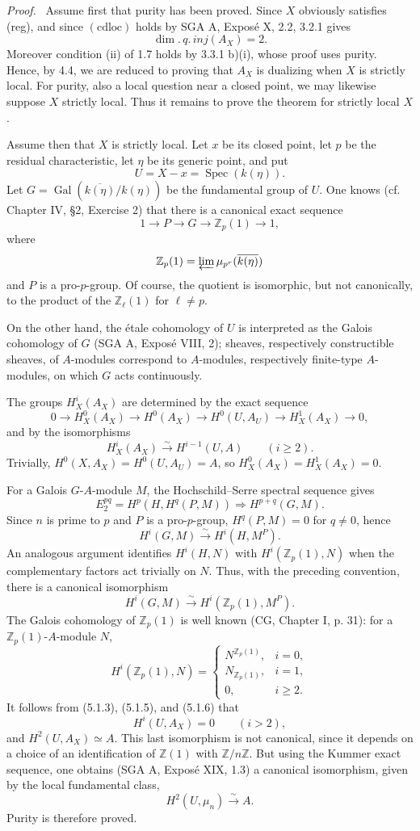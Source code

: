 \documentclass[11pt]{article}
\theoremstyle{plain}
\theoremstyle{definition}
\theoremstyle{remark}
\newenvironment{prooftext}{\par\noindent\textit{Proof.}\ }{\par\medskip}
\newcommand{\ZZ}{\mathbb Z}
\DeclareMathOperator{\Spec}{Spec}
\DeclareMathOperator{\Gal}{Gal}
\begin{document}
\begin{prooftext}
Assume first that purity has been proved. Since $X$ obviously satisfies (reg), and since $(\mathrm{cdloc})$ holds by SGA A, Exposé X, 2.2, 3.2.1 gives
\[
   \dim.\,q.\,inj(A_X)=2.
\]
Moreover condition (ii) of 1.7 holds by 3.3.1 b)(i), whose proof uses purity. Hence, by 4.4, we are reduced to proving that $A_X$ is dualizing when $X$ is strictly local. For purity, also a local question near a closed point, we may likewise suppose $X$ strictly local. Thus it remains to prove the theorem for strictly local $X$.

Assume then that $X$ is strictly local. Let $x$ be its closed point, let $p$ be the residual characteristic, let $\eta$ be its generic point, and put
\[
   U=X-x=\Spec(k(\eta)).
\]
Let $G=\Gal(\overline{k(\eta)}/k(\eta))$ be the fundamental group of $U$. One knows (cf. Chapter IV, §2, Exercise 2) that there is a canonical exact sequence
\[
   1\longrightarrow P\longrightarrow G\longrightarrow \ZZ_p(1)\longrightarrow1,\tag{5.1.1}
\]
where
\[
   \ZZ_p(1)=\varprojlim \mu_{p^r}(\overline{k(\eta)})
\]
and $P$ is a pro-$p$-group. Of course, the quotient is isomorphic, but not canonically, to the product of the $\ZZ_\ell(1)$ for $\ell\ne p$.

On the other hand, the étale cohomology of $U$ is interpreted as the Galois cohomology of $G$ (SGA A, Exposé VIII, 2); sheaves, respectively constructible sheaves, of $A$-modules correspond to $A$-modules, respectively finite-type $A$-modules, on which $G$ acts continuously.

The groups $H^i_X(A_X)$ are determined by the exact sequence
\[
0\to H^0_X(A_X)\to H^0(A_X)\to H^0(U,A_U)
\to H^1_X(A_X)\to0,\tag{5.1.2}
\]
and by the isomorphisms
\[
   H^i_X(A_X)\xrightarrow{\sim}H^{i-1}(U,A)
      \qquad(i\ge2).\tag{5.1.3}
\]
Trivially, $H^0(X,A_X)=H^0(U,A_U)=A$, so $H^0_X(A_X)=H^1_X(A_X)=0$.

For a Galois $G$-$A$-module $M$, the Hochschild--Serre spectral sequence gives
\[
   E_2^{pq}=H^p(H,H^q(P,M))\Rightarrow H^{p+q}(G,M).
\]
Since $n$ is prime to $p$ and $P$ is a pro-$p$-group, $H^q(P,M)=0$ for $q\ne0$, hence
\[
   H^i(G,M)\xrightarrow{\sim}H^i(H,M^P).\tag{5.1.4}
\]
An analogous argument identifies $H^i(H,N)$ with $H^i(\ZZ_p(1),N)$ when the complementary factors act trivially on $N$. Thus, with the preceding convention, there is a canonical isomorphism
\[
   H^i(G,M)\xrightarrow{\sim}H^i(\ZZ_p(1),M^P).\tag{5.1.5}
\]
The Galois cohomology of $\ZZ_p(1)$ is well known (CG, Chapter I, p. 31): for a $\ZZ_p(1)$-$A$-module $N$,
\[
H^i(\ZZ_p(1),N)=
\begin{cases}
N^{\ZZ_p(1)},& i=0,\\
N_{\ZZ_p(1)},& i=1,\\
0,& i\ge2.
\end{cases}\tag{5.1.6}
\]
It follows from (5.1.3), (5.1.5), and (5.1.6) that
\[
   H^i(U,A_X)=0\qquad(i>2),
\]
and $H^2(U,A_X)\simeq A$. This last isomorphism is not canonical, since it depends on a choice of an identification of $\ZZ(1)$ with $\ZZ/n\ZZ$. But using the Kummer exact sequence, one obtains (SGA A, Exposé XIX, 1.3) a canonical isomorphism, given by the local fundamental class,
\[
   H^2(U,\mu_n)\xrightarrow{\sim}A.\tag{5.1.7}
\]
Purity is therefore proved.


\end{prooftext}
\end{document}
